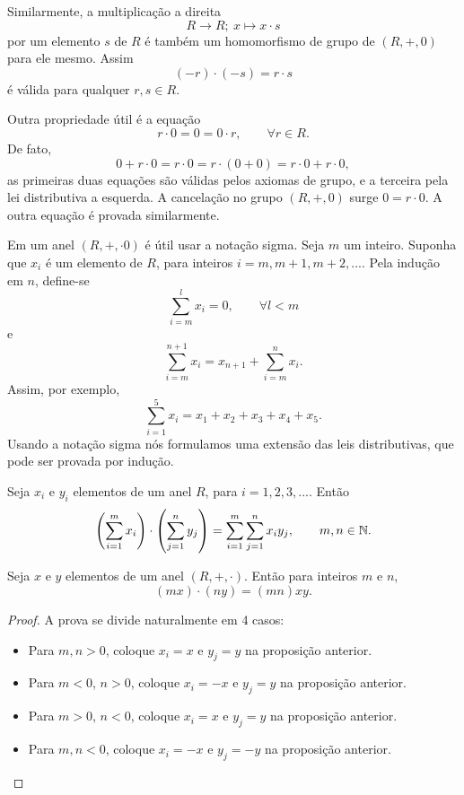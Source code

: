 Similarmente, a multiplicação a direita $$R \to R;\ x \mapsto x \cdot s$$ por um elemento $s$ de $R$ é também um homomorfismo de grupo de $(R,+,0)$ para ele mesmo. Assim $$(-r) \cdot (-s) = r \cdot s$$ é válida para qualquer $r,s \in R$.

Outra propriedade útil é a equação $$r \cdot 0 = 0 = 0 \cdot r,\quad \quad \forall r \in R.$$ De fato, $$0 + r \cdot 0 = r \cdot 0 = r \cdot (0 + 0) = r \cdot 0 + r \cdot 0,$$ as primeiras duas equações são válidas pelos axiomas de grupo, e a terceira pela lei distributiva a esquerda. A cancelação no grupo $(R,+,0)$ surge $0=r \cdot 0$. A outra equação é provada similarmente.

Em um anel $(R,+,\cdot0)$ é útil usar a notação sigma. Seja $m$ um inteiro. Suponha que $x_{i}$ é um elemento de $R$, para inteiros $i=m, m+1 , m+2 , ...$. Pela indução em $n$, define-se $$\sum^{l}_{i=m} x_{i} = 0,\quad \quad \forall l < m$$ e $$\sum^{n+1}_{i=m} x_{i} = x_{n+1} + \sum^{n}_{i=m} x_{i}.$$ Assim, por exemplo, $$\sum^{5}_{i=1} x_{i} = x_{1} + x_{2} + x_{3} + x_{4} + x_{5}.$$ Usando a notação sigma nós formulamos uma extensão das leis distributivas, que pode ser provada por indução.

\begin{stat}
  Seja $x_{i}$ e $y_{i}$ elementos de um anel $R$, para $i=1,2,3, ...$. Então $$\left(\sum^{m}_{i=1}x_{i}\right) \cdot \left(\sum^{n}_{j=1}y_{j}\right) = \sum^{m}_{i=1}\sum^{n}_{j=1}x_{i}y_{j},\quad \quad m,n \in \mathbb{N}.$$
\end{stat}
\begin{corollary}
  Seja $x$ e $y$ elementos de um anel $(R,+,\cdot)$. Então para inteiros $m$ e $n$, $$(mx) \cdot (ny) = (mn)xy.$$
  \begin{proof}
    A prova se divide naturalmente em 4 casos:
    \begin{itemize}
      \item Para $m,n > 0$, coloque $x_{i} = x$ e $y_{j} = y$ na proposição anterior.
      \item Para $m < 0$, $n > 0$, coloque $x_{i} = -x$ e $y_{j} = y$ na proposição anterior.
      \item Para $m > 0$, $n < 0$, coloque $x_{i} = x$ e $y_{j} = y$ na proposição anterior.
      \item Para $m,n < 0$, coloque $x_{i} = -x$ e $y_{j} = -y$ na proposição anterior.
    \end{itemize}
  \end{proof}
\end{corollary}

